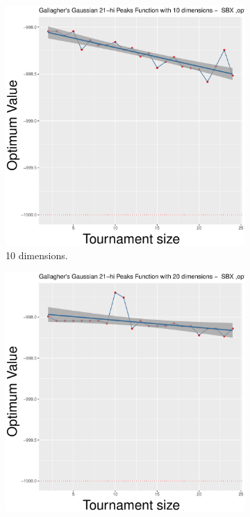 \begin{figure}[t]
	\begin{subfigure}[b]{0.33\textwidth}
		\centering
		\includegraphics[width=\textwidth]{img/SBX-10D/multimodal_sbx_22_dim_10.pdf}
		\caption{10 dimensions.}
	\end{subfigure}
	\begin{subfigure}[b]{0.33\textwidth}
		\centering
		\includegraphics[width=\textwidth]{img/SBX-20D/multimodal_sbx_22_dim_20.pdf}

\end{subfigure}
\end{figure}
